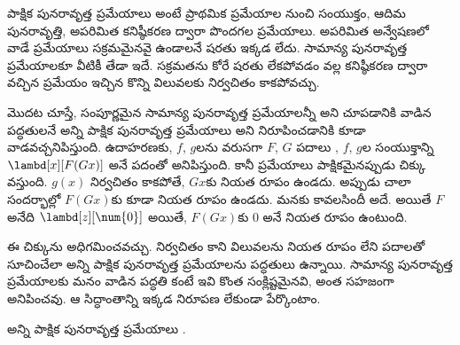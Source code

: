 \documentclass[../../../include/open-logic-section]{subfiles}
\begin{document}

పాక్షిక పునరావృత్త ప్రమేయాలు అంటే ప్రాథమిక ప్రమేయాల నుంచి
సంయుక్తం, ఆదిమ పునరావృత్తి, అపరిమిత కనిష్ఠీకరణ ద్వారా
పొందగల ప్రమేయాలు. అపరిమిత అన్వేషణలో వాడే ప్రమేయాలు
సక్రమమైనవై ఉండాలనే షరతు ఇక్కడ లేదు. సామాన్య పునరావృత్త
ప్రమేయాలకూ వీటికీ తేడా ఇదే. సక్రమతను కోరే షరతు లేకపోవడం వల్ల
కనిష్ఠీకరణ ద్వారా వచ్చిన ప్రమేయం ఇచ్చిన కొన్ని విలువలకు
నిర్వచితం కాకపోవచ్చు.

మొదట చూస్తే, సంపూర్ణమైన సామాన్య పునరావృత్త ప్రమేయాలన్నీ
అని చూపడానికి వాడిన పద్ధతులనే అన్ని పాక్షిక పునరావృత్త
ప్రమేయాలు 
అని నిరూపించడానికి కూడా వాడవచ్చనిపిస్తుంది. ఉదాహరణకు, $f$, $g$లను
వరుసగా $F$, $G$ పదాలు
,
$f$, $g$ల సంయుక్తాన్ని $\lambd[x][F (G x)]$ అనే పదంతో
 అనిపిస్తుంది.
కానీ ప్రమేయాలు పాక్షికమైనప్పుడు చిక్కు వస్తుంది. $g(x)$
నిర్వచితం కాకపోతే, $G x$కు నియత రూపం ఉండదు.
అప్పుడు చాలా సందర్భాల్లో $F (G x)$కు కూడా నియత రూపం
ఉండదు. మనకు కావలసిందీ అదే. అయితే $F$ అనేది
$\lambd[z][\num{0}]$ అయితే, $F (G x)$కు
$\num{0}$ అనే నియత రూపం ఉంటుంది.

ఈ చిక్కును అధిగమించవచ్చు. నిర్వచితం కాని విలువలను నియత రూపం
లేని పదాలతో సూచించేలా అన్ని పాక్షిక పునరావృత్త ప్రమేయాలను
 పద్ధతులు ఉన్నాయి.
సామాన్య పునరావృత్త ప్రమేయాలకు మనం వాడిన పద్ధతి కంటే
ఇవి కొంత సంక్లిష్టమైనవి, అంత సహజంగా అనిపించవు.
ఆ సిద్ధాంతాన్ని ఇక్కడ నిరూపణ లేకుండా పేర్కొంటాం.

\begin{thm}
  అన్ని పాక్షిక పునరావృత్త ప్రమేయాలు
  .
\end{thm}
\end{document}
